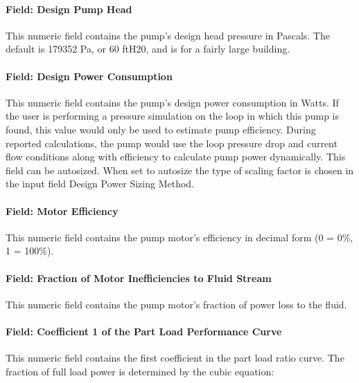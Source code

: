 \paragraph{Field: Design Pump Head}\label{field-design-pump-head}

This numeric field contains the pump's design head pressure in Pascals. The default is 179352 Pa, or 60 ftH20, and is for a fairly large building.

\paragraph{Field: Design Power Consumption}\label{field-design-power-consumption}

This numeric field contains the pump's design power consumption in Watts. If the user is performing a pressure simulation on the loop in which this pump is found, this value would only be used to estimate pump efficiency. During reported calculations, the pump would use the loop pressure drop and current flow conditions along with efficiency to calculate pump power dynamically. This field can be autosized. When set to autosize the type of scaling factor is chosen in the input field Design Power Sizing Method.

\paragraph{Field: Motor Efficiency}\label{field-motor-efficiency-000}

This numeric field contains the pump motor's efficiency in decimal form (0 = 0\%, 1 = 100\%).

\paragraph{Field: Fraction of Motor Inefficiencies to Fluid Stream}\label{field-fraction-of-motor-inefficiencies-to-fluid-stream}

This numeric field contains the pump motor's fraction of power loss to the fluid.

\paragraph{Field: Coefficient 1 of the Part Load Performance Curve}\label{field-coefficient-1-of-the-part-load-performance-curve}

This numeric field contains the first coefficient in the part load ratio curve. The fraction of full load power is determined by the cubic equation:

